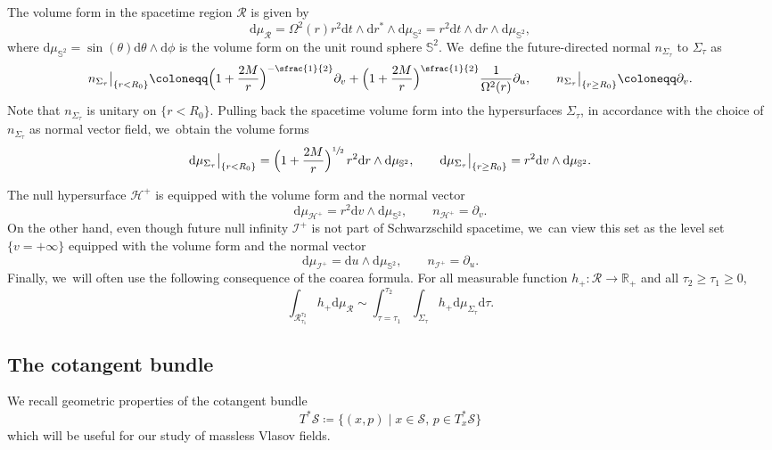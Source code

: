 \documentclass[JEP,XML,SOM,Unicode,published]{cedram}
\theoremstyle{plain}
\theoremstyle{definition}
\newcommand\R{{\mathbb{R}}}
\renewcommand\H{{\mathcal{H}^+}}
\newcommand\dr{{\mathrm{d}}}
\begin{document}
The volume form in the spacetime region $\mathcal{R}$ is given by
\[
\dr \mu_{\mathcal{R}}=\Omega^2(r)r^2 \dr t\wedge \dr r^* \wedge \dr\mu_{\mathbb{S}^2}=r^2 \dr t\wedge \dr r \wedge \dr\mu_{\mathbb{S}^2},
\]
where $\dr \mu_{\mathbb{S}^2} = \sin(\theta) \dr \theta \wedge \dr \phi$ is the volume form on the unit round sphere $\mathbb{S}^2$. We~define the future-directed normal $n_{\Sigma_\tau}$ to $\Sigma_\tau$ as
\begin{equation*}
n_{\Sigma_\tau}\big|_{\{r<R_0\}}\coloneqq \Bigl(1+\frac{2M}{r} \Bigr)^{-\sfrac{1}{2}}\partial_v+\Bigl(1+\frac{2M}{r}\Bigr)^{\sfrac{1}{2}}\frac{1}{\Omega^2(r)}\partial_u,\qquad n_{\Sigma_\tau}\big|_{\{r\geq R_0\}}\coloneqq\partial_v.
\end{equation*}
Note that $n_{\Sigma_\tau}$ is unitary on $\{ r < R_0 \}$. Pulling back the spacetime volume form into the hypersurfaces $\Sigma_\tau$, in accordance with the choice of $n_{\Sigma_\tau}$ as normal vector field, we~obtain the volume forms
\begin{equation*}
\dr \mu_{\Sigma_\tau}\big|_{\{r<R_0\}}=\Bigl(1+\frac{2M}{r}\Bigr)^{\sfrac{1}{2}} \,r^2 \dr r \wedge \dr\mu_{\mathbb{S}^2},\qquad \dr \mu_{\Sigma_\tau}\big|_{\{r\geq R_0\}}=r^2 \dr v \wedge \dr\mu_{\mathbb{S}^2}.
\end{equation*}

The null hypersurface $\H$ is equipped with the volume form and the normal vector
\[
\dr \mu_{\mathcal{H}^+}=r^2 \dr v \wedge \dr\mu_{\mathbb{S}^2},\qquad n_{\H}=\partial_v.
\]
On the other hand, even though future null infinity $\mathcal{I}^+$ is not part of Schwarzschild spacetime, we~can view this set as the level set $\{v=+\infty\}$ equipped with the volume form and the normal vector
\[
\dr \mu_{\mathcal{I}^+}= \dr u \wedge \dr\mu_{\mathbb{S}^2},\qquad n_{\mathcal{I}^+}=\partial_u.
\]
Finally, we~will often use the following consequence of the coarea formula. For all measurable function $h_+ \colon \mathcal{R} \to \R_+$ and all $\tau_2 \geq \tau_1 \geq 0$,
\begin{equation}\label{eq:coarea}
\int_{\mathcal{R}_{\tau_1}^{\tau_2}} h_+ \dr \mu_{\mathcal{R}} \sim \int_{\tau = \tau_1}^{\tau_2} \int_{\Sigma_\tau} h_+ \dr \mu_{\Sigma_\tau} \dr \tau \tag{coarea}.
\end{equation}

\subsection{The cotangent bundle}\label{Subseccotan} We recall geometric properties of the cotangent bundle
\[
T^* \mathcal{S} \coloneqq \{ (x,p) \mid x \in \mathcal{S}, \, p \in T^*_x\mathcal{S} \}
\]
which will be useful for our study of massless Vlasov fields.
\end{document}
